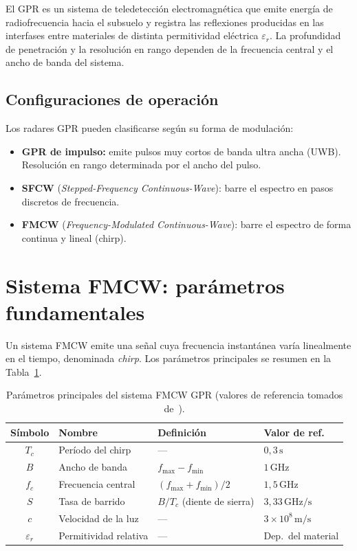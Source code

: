 \documentclass[12pt, a4paper, twoside]{report}
\begin{document}
El GPR es un sistema de teledetección electromagnética que emite
energía de radiofrecuencia hacia el subsuelo y registra las reflexiones
producidas en las interfases entre materiales de distinta permitividad
eléctrica $\varepsilon_r$. La profundidad de penetración y la resolución
en rango dependen de la frecuencia central y el ancho de banda del sistema.

\subsection{Configuraciones de operación}

Los radares GPR pueden clasificarse según su forma de modulación:

\begin{itemize}
  \item \textbf{GPR de impulso:} emite pulsos muy cortos de banda ultra
    ancha (UWB). Resolución en rango determinada por el ancho del
    pulso.
  \item \textbf{SFCW} (\textit{Stepped-Frequency Continuous-Wave}): barre
    el espectro en pasos discretos de frecuencia.
  \item \textbf{FMCW} (\textit{Frequency-Modulated Continuous-Wave}): barre
    el espectro de forma continua y lineal (chirp).
\end{itemize}

\section{Sistema FMCW: parámetros fundamentales}
\label{sec:parametros_fmcw}

Un sistema FMCW emite una señal cuya frecuencia instantánea varía
linealmente en el tiempo, denominada \textit{chirp}. Los parámetros
principales se resumen en la Tabla~\ref{tab:parametros}.

\begin{table}[H]
  \centering
  \caption{Parámetros principales del sistema FMCW GPR
  (valores de referencia tomados de~\cite{Huang2022}).}
  \label{tab:parametros}
  \begin{tabular}{clll}
    \toprule
    \textbf{Símbolo} & \textbf{Nombre} & \textbf{Definición} & \textbf{Valor de ref.}\\
    \midrule
    $T_c$  & Período del chirp     & —                      & $0{,}3\,\text{s}$          \\
    $B$    & Ancho de banda        & $f_\text{max} - f_\text{min}$ & $1\,\text{GHz}$      \\
    $f_c$  & Frecuencia central    & $(f_\text{max}+f_\text{min})/2$ & $1{,}5\,\text{GHz}$\\
    $S$    & Tasa de barrido       & $B/T_c$ (diente de sierra) & $3{,}33\,\text{GHz/s}$ \\
    $c$    & Velocidad de la luz   & —                      & $3\times10^8\,\text{m/s}$  \\
    $\varepsilon_r$ & Permitividad relativa & — & Dep.\ del material        \\
    \bottomrule
  \end{tabular}
\end{table}
\end{document}
